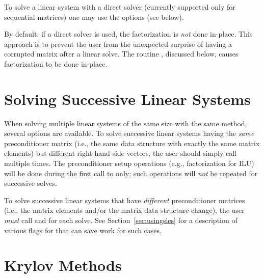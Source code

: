 To solve a linear system with a direct solver (currently supported 
only for sequential matrices) one may use the options
    (see below).

By default, if a direct solver is used, the factorization is {\em not} done 
in-place. This approach is to prevent the user from the unexpected surprise
of having a corrupted matrix after a linear solve. The routine 
, discussed below, causes factorization to 
be done in-place.  

\section{Solving Successive Linear Systems}

When solving multiple linear systems of the same size with the same
method, several options are available.  To solve successive linear
systems having the {\em same} preconditioner matrix (i.e., the same
data structure with exactly the same matrix elements) but different
right-hand-side vectors, the user should simply call 
multiple times.  The preconditioner setup operations (e.g.,
factorization for ILU) will be done during the first call to  only; such operations will {\em not} be repeated for
successive solves.

To solve successive linear systems that have {\em different}
preconditioner matrices (i.e., the matrix elements and/or the matrix
data structure change), the user {\em must} call 
 and  for each solve.  See
Section~\ref{sec:usingsles} for a description of various flags for
 that can save work for such cases.

\section{Krylov Methods}
\label{sec:ksp}

